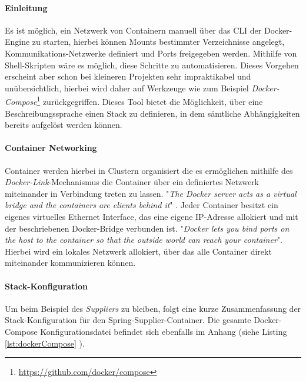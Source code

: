 \paragraph{Einleitung}
Es ist möglich, ein Netzwerk von Containern manuell über das CLI der Docker-Engine zu starten, hierbei können Mounts bestimmter Verzeichnisse angelegt, Kommunikations-Netzwerke definiert und Ports freigegeben werden. Mithilfe von Shell-Skripten wäre es möglich, diese Schritte zu automatisieren. Dieses Vorgehen erscheint aber schon bei kleineren Projekten sehr impraktikabel und unübersichtlich, hierbei wird daher auf Werkzeuge wie zum Beispiel \emph{Docker-Compose}\footnote{\url{https://github.com/docker/compose}} zurückgegriffen. Dieses Tool bietet die Möglichkeit, über eine Beschreibungssprache einen Stack zu definieren, in dem sämtliche Abhängigkeiten bereits aufgelöst werden können. 

\paragraph{Container Networking}
Container werden hierbei in Clustern organisiert die es ermöglichen mithilfe des \emph{Docker-Link}-Mechanismus die Container über ein definiertes Netzwerk miteinander in Verbindung treten zu lassen. "\emph{The Docker server acts as a virtual bridge and the containers are clients behind it}" \cite[Seite~13]{oreilly-docker}. Jeder Container besitzt ein eigenes virtuelles Ethernet Interface, das eine eigene IP-Adresse allokiert und mit der beschriebenen Docker-Bridge verbunden ist. "\emph{Docker lets you bind ports on the host to the container so that the outside world can reach your container}". Hierbei wird ein lokales Netzwerk allokiert, über das alle Container direkt miteinander kommunizieren können.

\paragraph{Stack-Konfiguration}
Um beim Beispiel des \emph{Suppliers} zu bleiben, folgt eine kurze Zusammenfassung der Stack-Konfiguration für den Spring-Supplier-Container. Die gesamte Docker-Compose Konfigurationsdatei befindet sich ebenfalls im Anhang (siehe Listing \ref{lst:dockerCompose} ).

